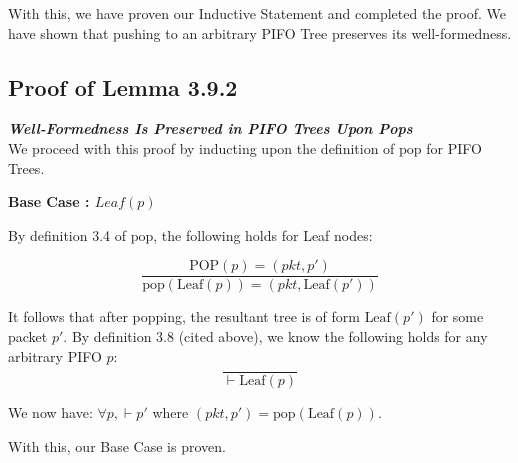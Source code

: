 \documentclass{article}
\begin{document}
\noindent With this, we have proven our Inductive Statement and completed the proof. We have shown that pushing to an arbitrary PIFO Tree preserves its well-formedness.\\[-10pt]

\subsection{Proof of Lemma 3.9.2}
\noindent \textit{\textbf{Well-Formedness Is Preserved in PIFO Trees Upon Pops}}\\[10pt]

\noindent We proceed with this proof by inducting upon the definition of $\text{pop}$ for PIFO Trees.\newline

\noindent \textbf{Base Case : $Leaf(p)$}\newline

\noindent By definition 3.4 of $\text{pop}$, the following holds for Leaf nodes:

$$\frac{\text{POP}(p) = (pkt, p')}{\text{pop}(\text{Leaf}(p)) = (pkt, \text{Leaf}(p'))}$$

\noindent It follows that after popping, the resultant tree is of form $\text{Leaf}(p')$ for some packet $p'$. By definition 3.8 (cited above), we know the following holds for any arbitrary PIFO $p$:\\[-10pt]

$$\frac{}{\vdash \text{Leaf}(p)}$$

\noindent We now have: $\forall p, \vdash p'$ where $(pkt, p') = \text{pop}(\text{Leaf}(p))$.\newline

\noindent With this, our Base Case is proven.
\end{document}
